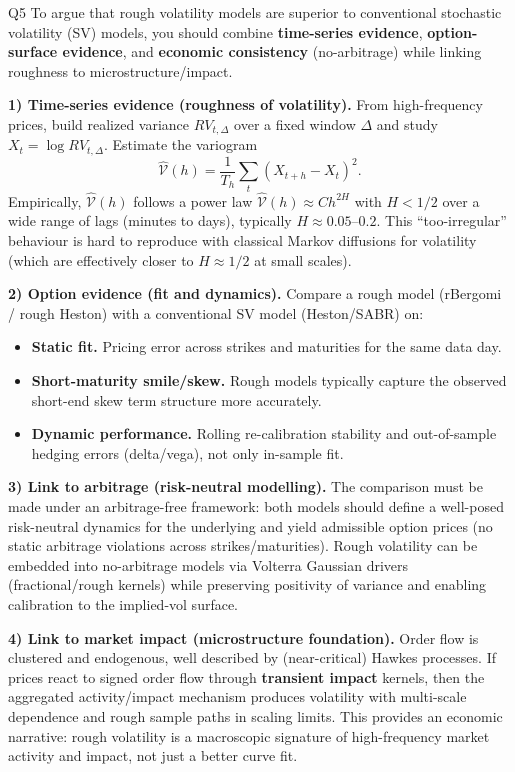 \begin{solutionbox}{Q5}
To argue that rough volatility models are superior to conventional stochastic volatility (SV) models, you should combine \textbf{time-series evidence}, \textbf{option-surface evidence}, and \textbf{economic consistency} (no-arbitrage) while linking roughness to microstructure/impact.

\medskip
\textbf{1) Time-series evidence (roughness of volatility).} From high-frequency prices, build realized variance \(RV_{t,\Delta}\) over a fixed window \(\Delta\) and study \(X_t=\log RV_{t,\Delta}\). Estimate the variogram
\[
\widehat{\mathcal V}(h)=\frac{1}{T_h}\sum_t (X_{t+h}-X_t)^2.
\]
Empirically, \(\widehat{\mathcal V}(h)\) follows a power law \(\widehat{\mathcal V}(h)\approx C h^{2H}\) with \(H<1/2\) over a wide range of lags (minutes to days), typically \(H\approx 0.05\)--\(0.2\). This ``too-irregular'' behaviour is hard to reproduce with classical Markov diffusions for volatility (which are effectively closer to \(H\approx 1/2\) at small scales).

\medskip
\textbf{2) Option evidence (fit and dynamics).} Compare a rough model (rBergomi / rough Heston) with a conventional SV model (Heston/SABR) on:
\begin{itemize}[leftmargin=*]
  \item \textbf{Static fit.} Pricing error across strikes and maturities for the same data day.
  \item \textbf{Short-maturity smile/skew.} Rough models typically capture the observed short-end skew term structure more accurately.
  \item \textbf{Dynamic performance.} Rolling re-calibration stability and out-of-sample hedging errors (delta/vega), not only in-sample fit.
\end{itemize}

\medskip
\textbf{3) Link to arbitrage (risk-neutral modelling).} The comparison must be made under an arbitrage-free framework: both models should define a well-posed risk-neutral dynamics for the underlying and yield admissible option prices (no static arbitrage violations across strikes/maturities). Rough volatility can be embedded into no-arbitrage models via Volterra Gaussian drivers (fractional/rough kernels) while preserving positivity of variance and enabling calibration to the implied-vol surface.

\medskip
\textbf{4) Link to market impact (microstructure foundation).} Order flow is clustered and endogenous, well described by (near-critical) Hawkes processes. If prices react to signed order flow through \textbf{transient impact} kernels, then the aggregated activity/impact mechanism produces volatility with multi-scale dependence and rough sample paths in scaling limits. This provides an economic narrative: rough volatility is a macroscopic signature of high-frequency market activity and impact, not just a better curve fit.


\end{solutionbox}
